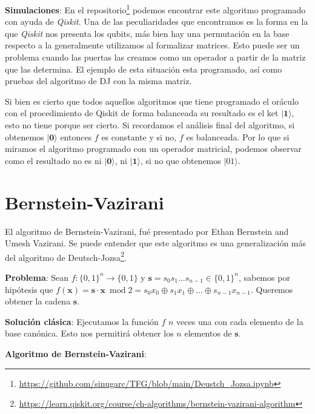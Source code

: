 \textbf{Simulaciones}: En el repositorio\footnote{\url{https://github.com/sinugarc/TFG/blob/main/Deustch_Jozsa.ipynb}} podemos encontrar este algoritmo programado con ayuda de \textit{Qiskit}. Una de las peculiaridades que encontramos es la forma en la que \textit{Qiskit} nos presenta los qubits, más bien hay una permutación en la base respecto a la generalmente utilizamos al formalizar matrices. Esto puede ser un problema cuando las puertas las creamos como un operador a partir de la matriz que las determina. El ejemplo de esta situación esta programado, así como pruebas del algoritmo de DJ con la misma matriz. \newline

Si bien es cierto que todos aquellos algoritmos que tiene programado el oráculo con el procedimiento de Qiskit de forma balanceada su resultado es el ket $|\mathbf{1}\rangle$, esto no tiene porque ser cierto. Si recordamos el análisis final del algoritmo, si obtenemos $|\textbf{0}\rangle$ entonces $f$ es constante y si no, $f$ es balanceada. Por lo que si miramos el algoritmo programado con un operador matricial, podemos observar como el resultado no es ni $|\textbf{0}\rangle$, ni $|\textbf{1}\rangle$, si no que obtenemos $|01\rangle$.


\section{Bernstein-Vazirani}
\label{Sec3.4:BV}

El algoritmo de Bernstein-Vazirani, fué presentado por Ethan Bernstein and Umesh Vazirani\cite{AR:BV:1997}. Se puede entender que este algoritmo es una generalización más del algoritmo de Deutsch-Jozsa\footnote{\url{https://learn.qiskit.org/course/ch-algorithms/bernstein-vazirani-algorithm}}.\newline

\textbf{Problema}: Sean  $f:\{0,1\}^{n} \rightarrow \{0,1\}$  y  $\mathbf{s}=s_{0}s_{1}...s_{n-1} \in \{0,1\}^{n}$, sabemos por hipótesis que  $f(\mathbf{x})=\mathbf{s}\cdot \mathbf{x}\:\; \text{mod} \; 2 = s_{0}x_{0} \oplus s_{1}x_{1} \oplus ... \oplus s_{n-1}x_{n-1}$. Queremos obtener la cadena $\mathbf{s}$.\newline

\textbf{Solución clásica}: Ejecutamos la función $f$ $n$ veces una con cada elemento de la base canónica. Esto nos permitirá obtener los $n$ elementos de $\mathbf{s}$.\newpage

\textbf{Algoritmo de Bernstein-Vazirani}:

